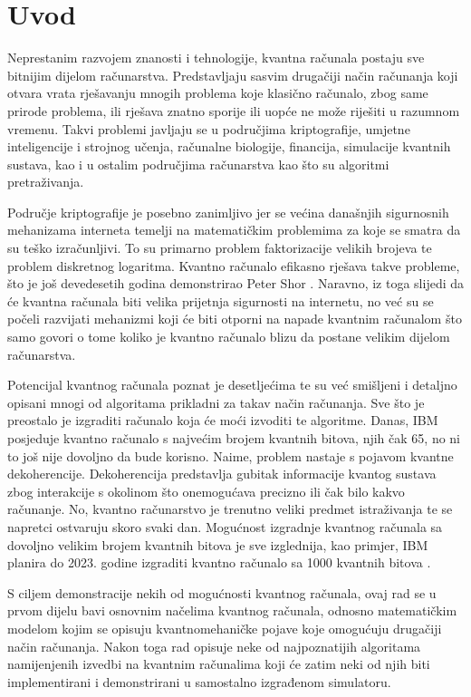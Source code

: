 \chapter{Uvod}
\label{ch:uvod}
Neprestanim razvojem znanosti i tehnologije, kvantna računala postaju sve bitnijim dijelom računarstva. Predstavljaju sasvim drugačiji način računanja koji otvara vrata rješavanju mnogih problema koje klasično računalo, zbog same prirode problema, ili rješava znatno sporije ili uopće ne može riješiti u razumnom vremenu. Takvi problemi javljaju se u područjima kriptografije, umjetne inteligencije i strojnog učenja, računalne biologije, financija, simulacije kvantnih sustava, kao i u ostalim područjima računarstva kao što su algoritmi pretraživanja.

Područje kriptografije je posebno zanimljivo jer se većina današnjih sigurnosnih mehanizama interneta temelji na matematičkim problemima za koje se smatra da su teško izračunljivi. To su primarno problem faktorizacije velikih brojeva te problem diskretnog logaritma. Kvantno računalo efikasno rješava takve probleme, što je još devedesetih godina demonstrirao Peter Shor \citep{Shor:1994jg}. Naravno, iz toga slijedi da će kvantna računala biti velika prijetnja sigurnosti na internetu, no već su se počeli razvijati mehanizmi koji će biti otporni na napade kvantnim računalom što  samo govori o tome koliko je kvantno računalo blizu da postane velikim dijelom računarstva.

Potencijal kvantnog računala poznat je desetljećima te su već smišljeni i detaljno opisani mnogi od algoritama prikladni za takav način računanja. Sve što je preostalo je izgraditi računalo koja će moći izvoditi te algoritme. Danas, IBM posjeduje kvantno računalo s najvećim brojem kvantnih bitova, njih čak 65, no ni to još nije dovoljno da bude korisno. Naime, problem nastaje s pojavom kvantne dekoherencije. Dekoherencija predstavlja gubitak informacije kvantog sustava zbog interakcije s okolinom što onemogućava precizno ili čak bilo kakvo računanje. No, kvantno računarstvo je trenutno veliki predmet istraživanja te se napretci ostvaruju skoro svaki dan. Mogućnost izgradnje kvantnog računala sa dovoljno velikim brojem kvantnih bitova je sve izglednija, kao primjer, IBM planira do 2023. godine izgraditi kvantno računalo sa 1000 kvantnih bitova \citep{ibm:quantum}.

S ciljem demonstracije nekih od mogućnosti kvantnog računala, ovaj rad se u prvom dijelu bavi osnovnim načelima kvantnog računala, odnosno matematičkim modelom kojim se opisuju kvantnomehaničke pojave koje omogućuju drugačiji način računanja. Nakon toga rad opisuje neke od najpoznatijih algoritama namijenjenih izvedbi na kvantnim računalima koji će zatim neki od njih biti implementirani i demonstrirani u samostalno izgrađenom simulatoru.